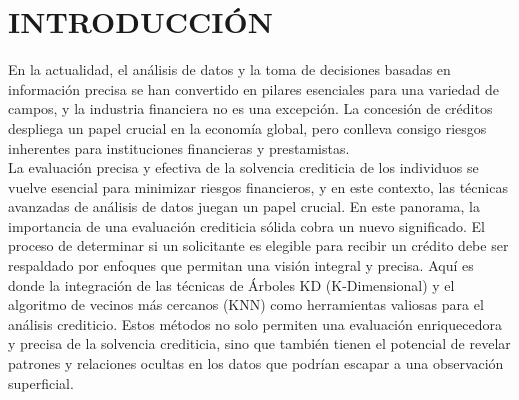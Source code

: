 \documentclass{article}
\begin{document}
\maketitle
\begin{sloppypar}
\tableofcontents
\clearpage

\section{INTRODUCCIÓN}

En la actualidad, el análisis de datos y la toma de decisiones basadas en información precisa se han convertido en pilares esenciales para una variedad de campos, y la industria financiera no es una excepción. La concesión de créditos despliega un papel crucial en la economía global, pero conlleva consigo riesgos inherentes para instituciones financieras y prestamistas. \\

La evaluación precisa y efectiva de la solvencia crediticia de los individuos se vuelve esencial para minimizar riesgos financieros, y en este contexto, las técnicas avanzadas de análisis de datos juegan un papel crucial. En este panorama, la importancia de una evaluación crediticia sólida cobra un nuevo significado. El proceso de determinar si un solicitante es elegible para recibir un crédito debe ser respaldado por enfoques que permitan una visión integral y precisa. Aquí es donde la integración de las técnicas de Árboles KD (K-Dimensional) y el algoritmo de vecinos más cercanos (KNN) como herramientas valiosas para el análisis crediticio. Estos métodos no solo permiten una evaluación enriquecedora y precisa de la solvencia crediticia, sino que también tienen el potencial de revelar patrones y relaciones ocultas en los datos que podrían escapar a una observación superficial.\\


\end{sloppypar}
\end{document}

